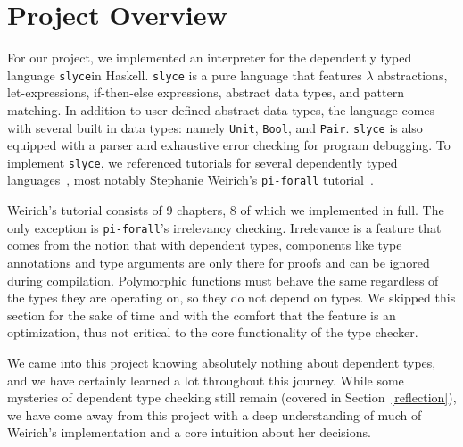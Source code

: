 \section{Project Overview}
For our project, we implemented an interpreter for the dependently typed language \texttt{slyce}\footnotemark in Haskell.
\texttt{slyce} is a pure language that features $\lambda$ abstractions, let-expressions, if-then-else expressions, abstract data types, and pattern matching.
In addition to user defined abstract data types, the language  comes with several built in data types: namely \texttt{Unit}, \texttt{Bool}, and \texttt{Pair}.
\texttt{slyce} is also equipped with a parser and exhaustive error checking for program debugging.  
To implement \texttt{slyce}, we referenced tutorials for several dependently typed languages~\cite{friedman2018little, loh2010tutorial}, most notably Stephanie Weirich's \texttt{pi-forall} tutorial~\cite{weirich2022implementing}.

Weirich's tutorial consists of 9 chapters, 8 of which we implemented in full. 
The only exception is \texttt{pi-forall}'s irrelevancy checking.
Irrelevance is a feature that comes from the notion that with dependent types, components like type annotations and type arguments are only there for proofs and can be ignored during compilation.
Polymorphic functions must behave the same regardless of the types they are operating on, so they do not depend on types.
We skipped this section for the sake of time and with the comfort that the feature is an optimization, thus not critical to the core functionality of the type checker.

We came into this project knowing absolutely nothing about dependent types, and we have certainly learned a lot throughout this journey.
While some mysteries of dependent type checking still remain (covered in Section~\ref{reflection}), we have come away from this project with a deep understanding of much of Weirich's implementation and a core intuition about her decisions.
